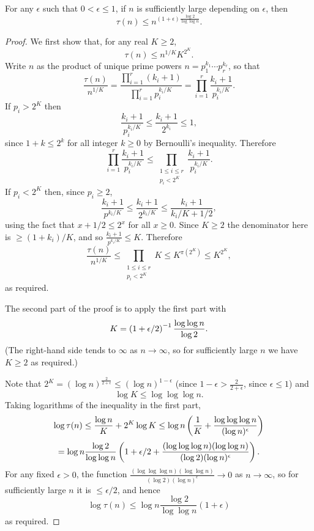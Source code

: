 \begin{lemma}{\label{lem:divisor_bound}}
\leanok
{}
For any $\epsilon$ such that $0<\epsilon\leq 1$, if $n$ is sufficiently large depending on $\epsilon$, then
\[\tau(n) \leq n^{(1+\epsilon)\frac{\log 2}{\log\log n}}.\]
\end{lemma}
\begin{proof}
\leanok
We first show that, for any real $K\geq 2$,
\[\tau(n) \leq n^{1/K}K^{2^K}.\]
Write $n$ as the product of unique prime powers $n=p_1^{k_1}\cdots p_r^{k_r}$, so that
\[\frac{\tau(n)}{n^{1/K}} = \frac{\prod_{i=1}^r (k_i+1)}{\prod_{i=1}^r p_i^{k_i/K}} = \prod_{i=1}^r \frac{k_i+1}{p_i^{k_i/K}}.\]
If $p_i>2^K$ then
\[\frac{k_i+1}{p_i^{k_i/K}}\leq \frac{k_i+1}{2^{k_i}}\leq 1,\]
since $1+k \leq 2^k$ for all integer $k\geq 0$ by Bernoulli's inequality. Therefore
\[ \prod_{i=1}^r \frac{k_i+1}{p_i^{k_i/K}} \leq \prod_{\substack{1\leq i\leq r\\ p_i<2^K}}\frac{k_i+1}{p_i^{k_i/K}}.\]
If $p_i<2^K$ then, since $p_i\geq 2$,
\[\frac{k_i+1}{p^{k_i/K}}\leq \frac{k_i+1}{2^{k_i/K}}\leq \frac{k_i+1}{k_i/K+1/2},\]
using the fact that $x+1/2\leq 2^x$ for all $x\geq 0$. Since $K\geq 2$ the denominator here is $\geq (1+k_i)/K$, and so $\frac{k_i+1}{p^{k_i/K}}\leq K$. Therefore
\[\frac{\tau(n)}{n^{1/K}}\leq \prod_{\substack{1\leq i\leq r\\ p_i<2^K}} K\leq K^{\pi(2^K)}\leq K^{2^K},\]
as required.

The second part of the proof is to apply the first part with
\[K=\left( 1+\epsilon/2\right)^{-1}\frac{\log\log n}{\log 2}.\]
(The right-hand side tends to $\infty$ as $n\to\infty$, so for sufficiently large $n$ we have $K\geq 2$ as required.)

Note that $2^K= (\log n)^{\frac{2}{2+\epsilon}}\leq (\log n)^{1-\epsilon}$ (since $1-\epsilon>\frac{2}{2+\epsilon}$, since $\epsilon\leq 1$) and
\[\log K \leq \log\log\log n.\]
Taking logarithms of the inequality in the first part,
\[\log \tau(n) \leq \frac{\log n}{K}+2^K\log K\leq \log n\left( \frac{1}{K}+\frac{\log\log\log n}{(\log n)^\epsilon}\right)\]
\[= \log n\frac{\log 2}{\log\log n}\left( 1+\epsilon/2+\frac{(\log\log\log n)(\log\log n)}{(\log 2)(\log n)^{\epsilon}}\right).\]
For any fixed $\epsilon>0$, the function $\frac{(\log\log\log n)(\log\log n)}{(\log 2)(\log n)^{\epsilon}}\to 0$ as $n\to \infty$, so for sufficiently large $n$ it is $\leq \epsilon/2$, and hence
\[\log \tau(n) \leq  \log n\frac{\log 2}{\log\log n}(1+\epsilon)\]
as required.

\end{proof}

